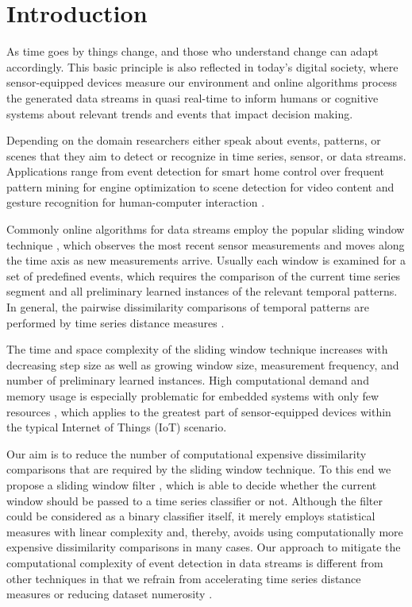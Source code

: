 \section{Introduction} \label{introduction}

As time goes by things change, and those who understand change can adapt accordingly. This basic principle is also reflected in today's digital society, where sensor-equipped devices measure our environment and online algorithms process the generated data streams in quasi real-time to inform humans or cognitive systems about relevant trends and events that impact decision making.

Depending on the domain researchers either speak about events, patterns, or scenes that they aim to detect or recognize in time series, sensor, or data streams. Applications range from event detection for smart home control \cite{spiegel2015metering} over frequent pattern mining for engine optimization \cite{spiegel2015driving} to scene detection for video content \cite{acar2011mediaeval} and gesture recognition for human-computer interaction \cite{liu2009uwave}.

Commonly online algorithms for data streams employ the popular sliding window technique \cite{keogh2004sliding}, which observes the most recent sensor measurements and moves along the time axis as new measurements arrive. Usually each window is examined for a set of predefined events, which requires the comparison of the current time series segment and all preliminary learned instances of the relevant temporal patterns. In general, the pairwise dissimilarity comparisons of temporal patterns are performed by time series distance measures \cite{spiegel2015diss}.

The time and space complexity of the sliding window technique increases with decreasing step size as well as growing window size, measurement frequency, and number of preliminary learned instances. High computational demand and memory usage is especially problematic for embedded systems with only few resources \cite{kratz2011mobile,wilhelm2015ring}, which applies to the greatest part of sensor-equipped devices within the typical Internet of Things (IoT) scenario.

Our aim is to reduce the number of computational expensive dissimilarity comparisons that are required by the sliding window technique. To this end we propose a sliding window filter \cite{lesti2017filter}, which is able to decide whether the current window should be passed to a time series classifier or not. Although the filter could be considered as a binary classifier itself, it merely employs statistical measures with linear complexity and, thereby, avoids using computationally more expensive dissimilarity comparisons in many cases. Our approach to mitigate the computational complexity of event detection in data streams is different from other techniques in that we refrain from accelerating time series distance measures \cite{sart2010accelerating,spiegel2014lucky} or reducing dataset numerosity \cite{xi2006fast}.


